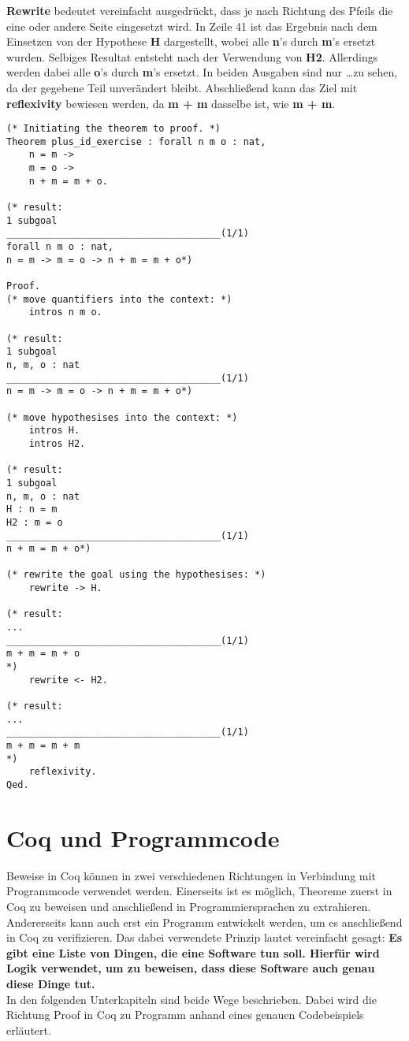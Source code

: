 \textbf{Rewrite} bedeutet vereinfacht ausgedrückt, dass je nach Richtung des Pfeils die eine oder andere Seite eingesetzt wird. In Zeile 41 ist das Ergebnis nach dem Einsetzen von der Hypothese \textbf{H} dargestellt, wobei alle \textbf{n}'s durch \textbf{m}'s ersetzt wurden. Selbiges Resultat entsteht nach der Verwendung von \textbf{H2}. Allerdings werden dabei alle \textbf{o}'s durch \textbf{m}'s ersetzt. In beiden Ausgaben sind nur \dots zu sehen, da der gegebene Teil unverändert bleibt.
Abschließend kann das Ziel mit \textbf{reflexivity} bewiesen werden, da \textbf{m + m} dasselbe ist, wie \textbf{m + m}.

\begin{lstlisting}[language=coq,firstnumber=1,caption=Coq Beispielbeweis,label=lst:sample-proof2]
(* Initiating the theorem to proof. *)
Theorem plus_id_exercise : forall n m o : nat,
	n = m ->
	m = o ->
	n + m = m + o.
	
(* result: 
1 subgoal
______________________________________(1/1)
forall n m o : nat,
n = m -> m = o -> n + m = m + o*)

Proof.
(* move quantifiers into the context: *)
	intros n m o. 
	
(* result: 
1 subgoal
n, m, o : nat
______________________________________(1/1)
n = m -> m = o -> n + m = m + o*)

(* move hypothesises into the context: *)	
	intros H.
	intros H2.

(* result: 
1 subgoal
n, m, o : nat
H : n = m
H2 : m = o
______________________________________(1/1)
n + m = m + o*)

(* rewrite the goal using the hypothesises: *)
	rewrite -> H.

(* result: 
...
______________________________________(1/1)
m + m = m + o
*)
	rewrite <- H2.

(* result:
...
______________________________________(1/1)
m + m = m + m
*)
	reflexivity.
Qed.
\end{lstlisting}

\section{Coq und Programmcode}
\label{s:coq-and-code}
Beweise in Coq können in zwei verschiedenen Richtungen in Verbindung mit Programmcode verwendet werden. Einerseits ist es möglich, Theoreme zuerst in Coq zu beweisen und anschließend in Programmiersprachen zu extrahieren. Andererseits kann auch erst ein Programm entwickelt werden, um es anschließend in Coq zu verifizieren. Das dabei verwendete Prinzip lautet vereinfacht gesagt:
\textbf{Es gibt eine Liste von Dingen, die eine Software tun soll. Hierfür wird Logik verwendet, um zu beweisen, dass diese Software auch genau diese Dinge tut.}
\\
In den folgenden Unterkapiteln sind beide Wege beschrieben. Dabei wird die Richtung Proof in Coq zu Programm anhand eines genauen Codebeispiels erläutert.


